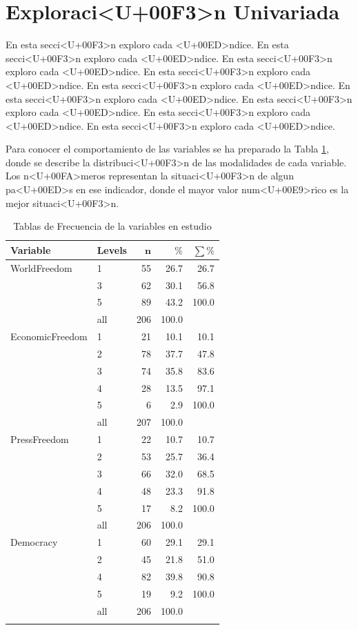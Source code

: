 \documentclass{article}
\begin{document}
\section{Exploraci<U+00F3>n Univariada}\label{univariada}

En esta secci<U+00F3>n exploro cada <U+00ED>ndice. En esta secci<U+00F3>n exploro cada <U+00ED>ndice. En esta secci<U+00F3>n exploro cada <U+00ED>ndice. En esta secci<U+00F3>n exploro cada <U+00ED>ndice. En esta secci<U+00F3>n exploro cada <U+00ED>ndice. En esta secci<U+00F3>n exploro cada <U+00ED>ndice. En esta secci<U+00F3>n exploro cada <U+00ED>ndice. En esta secci<U+00F3>n exploro cada <U+00ED>ndice. En esta secci<U+00F3>n exploro cada <U+00ED>ndice.





Para conocer el comportamiento de las variables se ha preparado la Tabla \ref{Tfrecuencias}, donde se describe la distribuci<U+00F3>n de las modalidades de cada variable. Los n<U+00FA>meros representan la situaci<U+00F3>n de algun pa<U+00ED>s en ese indicador, donde el mayor valor num<U+00E9>rico es la mejor situaci<U+00F3>n.

\begingroup\normalsize
\begin{longtable}{llrrr}
\caption{Tablas de Frecuencia de la variables en estudio} \\ 
 \textbf{Variable} & \textbf{Levels} & $\mathbf{n}$ & $\mathbf{\%}$ & $\mathbf{\sum \%}$ \\ 
  \hline \hline
WorldFreedom & 1 & 55 & 26.7 & 26.7 \\ 
   & 3 & 62 & 30.1 & 56.8 \\ 
   & 5 & 89 & 43.2 & 100.0 \\ 
   \hline
 & all & 206 & 100.0 &  \\ 
   \hline
\hline
EconomicFreedom & 1 & 21 & 10.1 & 10.1 \\ 
   & 2 & 78 & 37.7 & 47.8 \\ 
   & 3 & 74 & 35.8 & 83.6 \\ 
   & 4 & 28 & 13.5 & 97.1 \\ 
   & 5 & 6 & 2.9 & 100.0 \\ 
   \hline
 & all & 207 & 100.0 &  \\ 
   \hline
\hline
PressFreedom & 1 & 22 & 10.7 & 10.7 \\ 
   & 2 & 53 & 25.7 & 36.4 \\ 
   & 3 & 66 & 32.0 & 68.5 \\ 
   & 4 & 48 & 23.3 & 91.8 \\ 
   & 5 & 17 & 8.2 & 100.0 \\ 
   \hline
 & all & 206 & 100.0 &  \\ 
   \hline
\hline
Democracy & 1 & 60 & 29.1 & 29.1 \\ 
   & 2 & 45 & 21.8 & 51.0 \\ 
   & 4 & 82 & 39.8 & 90.8 \\ 
   & 5 & 19 & 9.2 & 100.0 \\ 
   \hline
 & all & 206 & 100.0 &  \\ 
   \hline
\hline
\hline
\label{Tfrecuencias}
\end{longtable}
\endgroup
\end{document}
